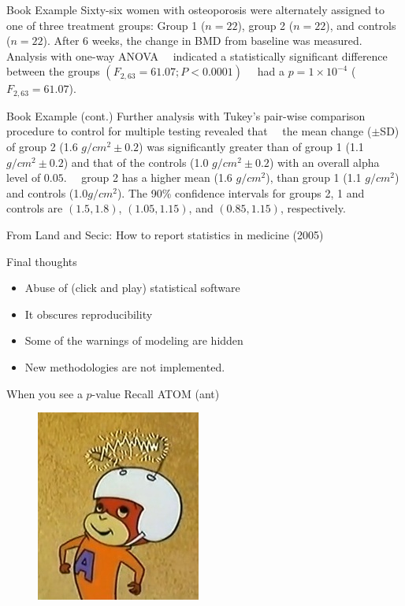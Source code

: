 \documentclass{beamer}
\begin{document}
\begin{frame}{Book Example}
Sixty-six women with osteoporosis were alternately assigned to one of three treatment groups: Group 1 ($n=22$), group 2 ($n=22$), and controls ($n=22$). After 6 weeks, the change in BMD from baseline was measured. Analysis with one-way ANOVA ~~indicated a statistically significant difference between the groups $(F_{2,63}=61.07;P<0.0001)$~~ had a $p=1\times 10^{-4}$ ($F_{2,63}=61.07$).
\end{frame}


\begin{frame}{Book Example (cont.)}
Further analysis with Tukey's pair-wise comparison procedure to control for multiple testing revealed that ~~the mean change (\( \pm \)SD) of group 2 (1.6 $g/cm^2 \pm 0.2$) was significantly greater than of group 1 (1.1 $g/cm^2\pm 0.2$) and that of the controls (1.0 $g/cm^2 \pm 0.2$) with an overall alpha level of $0.05$.~~ group 2 has a higher mean (1.6 $g/cm^2$), than group 1 (1.1 $g/cm^2$) and controls (1.0$g/cm^2$). The 90\% confidence intervals for groups 2, 1 and controls are $(1.5,1.8)$, $(1.05,1.15)$, and $(0.85,1.15)$, respectively.  

From Land and Secic: How to report statistics in medicine (2005)
	
\end{frame}

\begin{frame}{Final thoughts}
\begin{itemize}
	\item Abuse of (click and play) statistical software 
	\item It obscures reproducibility
	\item Some of the warnings of modeling are hidden
	\item New methodologies are not implemented.
\end{itemize}	
	
	
\end{frame}


\begin{frame}{When you see a $p$-value}
	Recall ATOM (ant) 

\begin{figure}[!htb]
		\centering
		\includegraphics[width=0.5\linewidth]{../../Figures/atom_ant.jpg}
\end{figure}
\end{frame}
\end{document}
